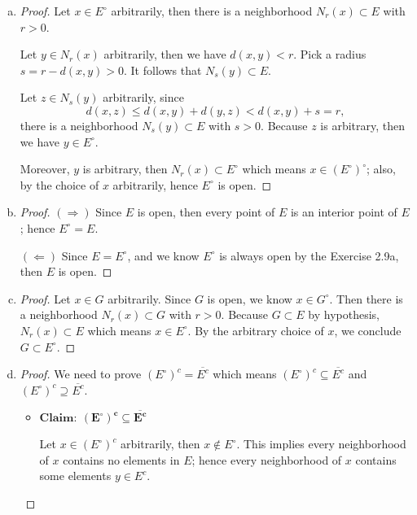 \begin{Exercise}
\begin{enumerate}[a)]
\item
\begin{proof}
Let $x\in E^{\circ}$ arbitrarily, then there is a neighborhood $N_r(x)\subset E$ with $r>0$.

Let $y\in N_r(x)$ arbitrarily, then we have $d(x,y)<r$. Pick a radius $s=r-d(x,y)>0$. It follows that $N_s(y)\subset E$. 

Let $z\in N_s(y)$ arbitrarily, since
$$
d(x,z) \leq d(x,y)+d(y,z) < d(x,y) + s = r,
$$
there is a neighborhood $N_s(y)\subset E$ with $s>0$. Because $z$ is arbitrary, then we have $y\in E^{\circ}$.

Moreover, $y$ is arbitrary, then $N_r(x)\subset E^{\circ}$ which means $x\in (E^{\circ})^{\circ}$; also, by the choice of $x$ arbitrarily, hence $E^{\circ}$ is open.
\end{proof}

\item
\begin{proof}
$(\Longrightarrow)$
Since $E$ is open, then every point of $E$ is an interior point of $E$; hence $E^{\circ} = E$.

$(\Longleftarrow)$
Since $E = E^{\circ}$, and we know $E^{\circ}$ is always open by the Exercise 2.9a, then $E$ is open.
\end{proof}

\item
\begin{proof}
Let $x\in G$ arbitrarily. Since $G$ is open, we know $x\in G^{\circ}$. Then there is a neighborhood $N_r(x)\subset G$ with $r>0$. Because $G\subset E$ by hypothesis, $N_r(x)\subset E$ which means $x\in E^{\circ}$. By the arbitrary choice of $x$, we conclude $G\subset E^{\circ}$.
\end{proof}

\item
\begin{proof}
We need to prove $(E^{\circ})^c = \overline{E^c}$ which means $(E^{\circ})^c \subseteq \overline{E^c}$ and $(E^{\circ})^c \supseteq \overline{E^c}$.

\begin{itemize}
\item $\mathbf{Claim:\ (E^{\circ})^c \subseteq \overline{E^c}}$

Let $x\in(E^{\circ})^c$ arbitrarily, then $x\notin E^{\circ}$. This implies every neighborhood of $x$ contains no elements in $E$; hence every neighborhood of $x$ contains some elements $y\in E^c$.


\end{itemize}
\end{proof}
\end{enumerate}
\end{Exercise}
